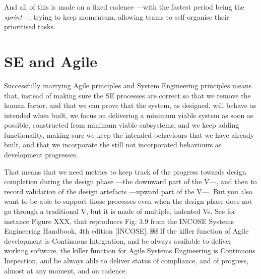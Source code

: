 \documentclass[11pt,twoside]{article}
\begin{document}
And all of this is made on a fixed cadence —with the fastest period being the \emph{sprint}—, trying to keep momentum, allowing teams to self-organise their prioritised tasks.	


\section{SE and Agile} %
\label{sec:se_and_agile}
Successfully marrying Agile principles and System Engineering principles means that, instead of making sure the SE processes are correct so that we remove the human factor, and that we can prove that the system, as designed, will behave as intended when built, we focus on delivering a minimum viable system as soon as possible, constructed from minimum viable subsystems, and we keep adding functionality, making sure we keep the intended behaviours that we have already built, and that we incorporate the still not incorporated behaviours as development progresses.	

That means that we need metrics to keep track of the progress towards design completion during the design phase —the downward part of the V—, and then to record validation of the design artefacts —upward part of the V—. But you also want to be able to support those processes even when the design phase does not go through a traditional V, but it is made of multiple, indented Vs. See for instance Figure XXX, that reproduces Fig. 3.9 from the INCOSE Systems Engineering Handbook, 4th edition [INCOSE].	
￼	
If the killer function of Agile development is Continuous Integration, and be always available to deliver working software, the killer function for Agile Systems Engineering is Continuous Inspection, and be always able to deliver status of compliance, and of progress, almost at any moment, and on cadence.	




\clearpage %
\end{document}
